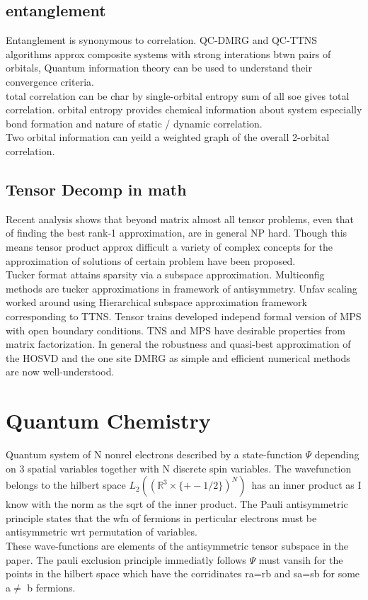 \documentclass[10pt, draft]{article}
\begin{document}
 \subsection{entanglement}
 
 Entanglement is synonymous to correlation.  QC-DMRG and QC-TTNS algorithms approx composite systems with strong interations btwn pairs of orbitals, Quantum information theory can be used to understand their convergence criteria.\\
 total correlation can be char by single-orbital entropy sum of all soe gives total correlation.  orbital entropy provides chemical information about system especially bond formation and nature of static / dynamic correlation.\\
 
 Two orbital information can yeild a weighted graph of the overall 2-orbital correlation.
 
 \subsection{Tensor Decomp in math}
 
 Recent analysis shows that beyond matrix almost all tensor problems, even that of finding the best rank-1 approximation, are in general NP hard. Though this means tensor product approx difficult a variety of complex concepts for the approximation of solutions of certain problem have been proposed.\\
 
 Tucker format attains sparsity via a subspace approximation.  Multiconfig methods are tucker approximations in framework of antisymmetry.  Unfav scaling worked around using Hierarchical subspace approximation framework corresponding to TTNS.  Tensor trains developed independ formal version of MPS with open boundary conditions.  TNS and MPS have desirable properties from matrix factorization.  In general the robustness and quasi-best approximation of the HOSVD and the one site DMRG as simple and efficient numerical methods are now well-understood.  
 
 \section{Quantum Chemistry}
  Quantum system of N nonrel electrons described by a state-function $\Psi$ depending on 3 spatial variables together with N discrete spin variables. The wavefunction belongs to the hilbert space $L_2((\mathbb{R}^3 \times \{+- 1/2\})^N)$\ has an inner product as I know  with the norm as the sqrt of the inner product.  The Pauli antisymmetric principle states that the wfn of fermions in perticular electrons must be antisymmetric wrt permutation of variables.\\
  These wave-functions are elements of the antisymmetric tensor subspace in the paper.  The pauli exclusion principle immediatly follows $\Psi$ must vansih for the points in the hilbert space which have the corridinates ra=rb and sa=sb for some a$\neq$ b fermions.\\
  
\end{document}
